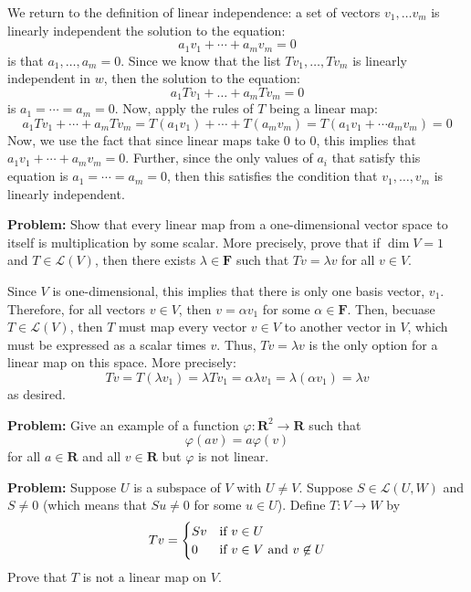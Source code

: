 \documentclass[10pt]{article}
\renewcommand{\R}{\mathbf R}
\newcommand{\F}{\mathbf F}
\newenvironment{problem}{\textbf{Problem:}}{}
\begin{document}
	\begin{solution}
		We return to the definition of linear independence: a set of vectors \( v_1, \dots v_m \) is linearly 
		independent the solution to the equation:
		\[
		a_1v_1 + \cdots + a_m v_m = 0
		\] 
		is that \( a_1, \dots, a_m = 0\). Since we know that the list \( Tv_1, \dots, Tv_m \) is linearly independent
		in \( w \), then the solution to the equation:
		\[
		a_1Tv_1 + \dots + a_mTv_m = 0
		\] 
		is \( a_1 = \cdots = a_m = 0 \). Now, apply the rules of \( T \) being a linear map:
		\[
		a_1Tv_1 + \cdots +  a_mTv_m = T(a_1v_1) + \cdots + T(a_m v_m) = T(a_1v_1 + \cdots a_m v_m) = 0
		\] 
		Now, we use the fact that since linear maps take 0 to 0, this implies that \( a_1 v_1 + \cdots + 
		a_m v_m = 0 \). Further, since the only values of \( a_i \) that satisfy this equation is 
		\( a_1 = \cdots = a_m = 0 \), then this satisfies the condition that \( v_1, \dots, v_m \) is linearly 
		independent.
	\end{solution}

	\begin{problem}
		Show that every linear map from a one-dimensional vector space to itself is multiplication by some 
		scalar. More precisely, prove that if \( \dim V =  1\) and \( T \in \mathcal L(V) \), then there 
		exists \( \lambda \in \F \) such that \( Tv = \lambda v \) for all \( v \in V \). 
	\end{problem}

	\begin{solution}
		Since \( V \) is one-dimensional, this implies that there is only one basis vector, \( v_1 \). Therefore, 
		for all vectors \( v \in V \), then \( v = \alpha v_1 \) for some \( \alpha \in \F \). Then, becuase 
		\( T \in \mathcal L(V) \), then \( T \) must map every vector \( v \in V \) to another vector in \( V \), 
		which must be expressed as a scalar times \( v \). Thus, \( Tv = \lambda v \) is the only option for 
		a linear map on this space. More precisely:
		\[
		Tv = T(\lambda v_1) = \lambda Tv_1 = \alpha \lambda v_1 = \lambda (\alpha v_1) = \lambda v
		\] 
		as desired. 
	\end{solution}

	\begin{problem}
		Give an example of a function \( \varphi: \R^2 \to \R \) such that 
		\[
		\varphi(av) = a \varphi(v)
		\] 
		for all \( a \in \R \) and all \( v \in \R \) but \( \varphi \) is not linear. 
	\end{problem}

	\begin{problem}
		Suppose \( U \) is a subspace of \( V \) with \( U \neq  V \). Suppose \( S \in \mathcal L(U, W) \) and 
		\( S \neq 0 \) (which means that \( Su \neq 0 \) for some \( u \in U \)). Define 
		\( T:V \to W \) by 
		\[
		Tv = \begin{cases}
			Sv & \text{if \( v \in U \)}\\
			0 & \text{if \( v \in V \) and \( v \not \in U \)}
		\end{cases}
		\] 
		Prove that \( T \) is not a linear map on \( V \). 
	\end{problem}
\end{document}
